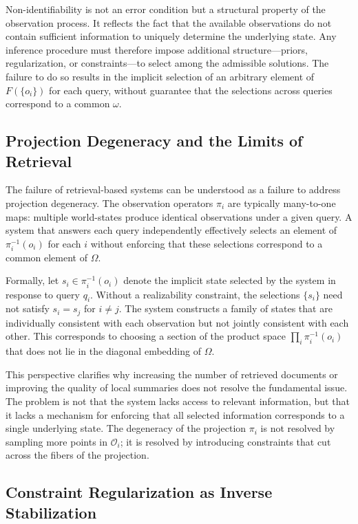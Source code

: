\documentclass[12pt, oneside]{article}
\begin{document}
Non-identifiability is not an error condition but a structural property of the observation process. It reflects the fact that the available observations do not contain sufficient information to uniquely determine the underlying state. Any inference procedure must therefore impose additional structure---priors, regularization, or constraints---to select among the admissible solutions. The failure to do so results in the implicit selection of an arbitrary element of $F(\{o_i\})$ for each query, without guarantee that the selections across queries correspond to a common $\omega$.

\subsection{Projection Degeneracy and the Limits of Retrieval}

The failure of retrieval-based systems can be understood as a failure to address projection degeneracy. The observation operators $\pi_i$ are typically many-to-one maps: multiple world-states produce identical observations under a given query. A system that answers each query independently effectively selects an element of $\pi_i^{-1}(o_i)$ for each $i$ without enforcing that these selections correspond to a common element of $\Omega$.

Formally, let $s_i \in \pi_i^{-1}(o_i)$ denote the implicit state selected by the system in response to query $q_i$. Without a realizability constraint, the selections $\{s_i\}$ need not satisfy $s_i = s_j$ for $i \neq j$. The system constructs a family of states that are individually consistent with each observation but not jointly consistent with each other. This corresponds to choosing a section of the product space $\prod_i \pi_i^{-1}(o_i)$ that does not lie in the diagonal embedding of $\Omega$.

This perspective clarifies why increasing the number of retrieved documents or improving the quality of local summaries does not resolve the fundamental issue. The problem is not that the system lacks access to relevant information, but that it lacks a mechanism for enforcing that all selected information corresponds to a single underlying state. The degeneracy of the projection $\pi_i$ is not resolved by sampling more points in $\mathcal{O}_i$; it is resolved by introducing constraints that cut across the fibers of the projection.

\subsection{Constraint Regularization as Inverse Stabilization}
\end{document}
